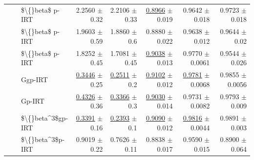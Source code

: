 \begin{longtable}{llp{}rrrrr}
 &  & \$\textbackslash\{\}beta\$ p-IRT & 2.2560 {\scriptsize $\pm$ 0.32} & 2.2106 {\scriptsize $\pm$ 0.33} & \underline{0.8966} {\scriptsize $\pm$ 0.019} & 0.9642 {\scriptsize $\pm$ 0.018} & 0.9723 {\scriptsize $\pm$ 0.018} \\
 &  & \$\textbackslash\{\}beta\$ p-IRT & 1.9603 {\scriptsize $\pm$ 0.59} & 1.8860 {\scriptsize $\pm$ 0.6} & 0.8880 {\scriptsize $\pm$ 0.022} & 0.9638 {\scriptsize $\pm$ 0.012} & 0.9644 {\scriptsize $\pm$ 0.02} \\
 &  & \$\textbackslash\{\}beta\$ p-IRT & 1.8252 {\scriptsize $\pm$ 0.45} & 1.7081 {\scriptsize $\pm$ 0.45} & \underline{0.9038} {\scriptsize $\pm$ 0.013} & 0.9770 {\scriptsize $\pm$ 0.0061} & 0.9544 {\scriptsize $\pm$ 0.026} \\
 &  & Ggp-IRT & \underline{0.3446} {\scriptsize $\pm$ 0.25} & \underline{0.2511} {\scriptsize $\pm$ 0.2} & \underline{0.9102} {\scriptsize $\pm$ 0.012} & \underline{0.9781} {\scriptsize $\pm$ 0.0068} & 0.9855 {\scriptsize $\pm$ 0.0056} \\
 &  & Gp-IRT & \underline{0.4326} {\scriptsize $\pm$ 0.36} & \underline{0.3366} {\scriptsize $\pm$ 0.3} & \underline{0.9030} {\scriptsize $\pm$ 0.014} & 0.9731 {\scriptsize $\pm$ 0.0082} & 0.9793 {\scriptsize $\pm$ 0.009} \\
 &  & \$\textbackslash\{\}beta\textasciicircum{}3\$gp-IRT & \underline{0.3391} {\scriptsize $\pm$ 0.16} & \underline{0.2393} {\scriptsize $\pm$ 0.1} & \underline{0.9090} {\scriptsize $\pm$ 0.012} & \underline{0.9816} {\scriptsize $\pm$ 0.0044} & 0.9891 {\scriptsize $\pm$ 0.003} \\
 &  & \$\textbackslash\{\}beta\textasciicircum{}3\$p-IRT & 0.9019 {\scriptsize $\pm$ 0.22} & 0.7626 {\scriptsize $\pm$ 0.11} & 0.8838 {\scriptsize $\pm$ 0.017} & 0.9590 {\scriptsize $\pm$ 0.015} & 0.8900 {\scriptsize $\pm$ 0.064} \\
\end{longtable}